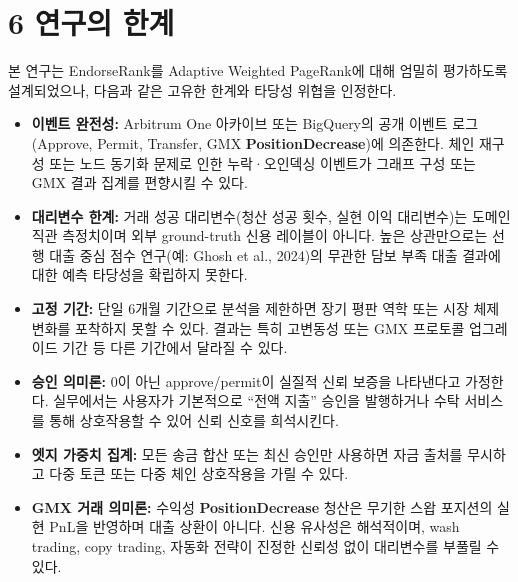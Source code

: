 \clearpage
{}
\section*{6 \textbf{연구의 한계}}
\label{sec:limitations}

본 연구는 EndorseRank를 Adaptive Weighted PageRank에 대해 엄밀히 평가하도록 설계되었으나, 다음과 같은 고유한 한계와 타당성 위협을 인정한다.



\begin{itemize}
\item[\textbullet] \textbf{이벤트 완전성:} Arbitrum One 아카이브 또는 BigQuery의 공개 이벤트 로그(Approve, Permit, Transfer, GMX \textbf{PositionDecrease})에 의존한다. 체인 재구성 또는 노드 동기화 문제로 인한 누락·오인덱싱 이벤트가 그래프 구성 또는 GMX 결과 집계를 편향시킬 수 있다.
\item[\textbullet] \textbf{대리변수 한계:} 거래 성공 대리변수(청산 성공 횟수, 실현 이익 대리변수)는 도메인 직관 측정치이며 외부 ground-truth 신용 레이블이 아니다. 높은 상관만으로는 선행 대출 중심 점수 연구(예: Ghosh et al., 2024)의 무관한 담보 부족 대출 결과에 대한 예측 타당성을 확립하지 못한다.
\end{itemize}

\begin{itemize}
\item[\textbullet] \textbf{고정 기간:} 단일 6개월 기간으로 분석을 제한하면 장기 평판 역학 또는 시장 체제 변화를 포착하지 못할 수 있다. 결과는 특히 고변동성 또는 GMX 프로토콜 업그레이드 기간 등 다른 기간에서 달라질 수 있다.
\end{itemize}

\begin{itemize}
\item[\textbullet] \textbf{승인 의미론:} 0이 아닌 approve/permit이 실질적 신뢰 보증을 나타낸다고 가정한다. 실무에서는 사용자가 기본적으로 ``전액 지출'' 승인을 발행하거나 수탁 서비스를 통해 상호작용할 수 있어 신뢰 신호를 희석시킨다.
\item[\textbullet] \textbf{엣지 가중치 집계:} 모든 송금 합산 또는 최신 승인만 사용하면 자금 출처를 무시하고 다중 토큰 또는 다중 체인 상호작용을 가릴 수 있다.
\item[\textbullet] \textbf{GMX 거래 의미론:} 수익성 \textbf{PositionDecrease} 청산은 무기한 스왑 포지션의 실현 PnL을 반영하며 대출 상환이 아니다. 신용 유사성은 해석적이며, wash trading, copy trading, 자동화 전략이 진정한 신뢰성 없이 대리변수를 부풀릴 수 있다.
\end{itemize}

